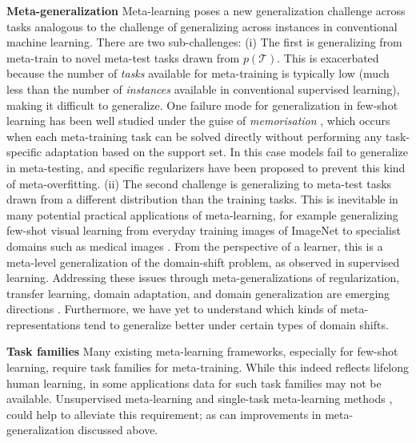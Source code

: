 \documentclass[10pt,journal,compsoc]{IEEEtran}
\newcommand{\cut}[1]{}
\newcommand{\keypoint}[1]{\vspace{0.1cm}\noindent\textbf{#1}\quad}
\begin{document}
\keypoint{Meta-generalization} {Meta-learning poses a new generalization challenge across tasks analogous to the challenge of generalizing across instances in conventional machine learning. There are two sub-challenges: (i) The first is generalizing from meta-train to novel meta-test tasks drawn from $p(\mathcal{T})$. This is exacerbated because the number of \emph{tasks} available for meta-training is typically low (much less than the number of \emph{instances} available in conventional supervised learning), making it difficult to generalize. One failure mode for generalization in few-shot learning has been well studied under the guise of \emph{memorisation} \cite{yin2019meta}, which occurs when each meta-training task can be solved directly without performing any task-specific adaptation based on the support set. In this case models fail to generalize in meta-testing, and specific regularizers \cite{yin2019meta} have been proposed to prevent this kind of meta-overfitting. 
(ii) The second challenge is generalizing to meta-test tasks drawn from a different distribution than the training tasks. This is inevitable in many potential practical applications of meta-learning, for example generalizing few-shot visual learning from everyday training images of ImageNet to specialist domains such as medical images \cite{guo2019new}. From the perspective of a learner, this is a meta-level generalization of the domain-shift problem, as observed in supervised learning. Addressing these issues through meta-generalizations of regularization, transfer learning, domain adaptation, and domain generalization are emerging directions \cite{tseng2020crossdomain}. Furthermore, we have yet to understand which kinds of meta-representations tend to generalize better under certain types of domain shifts. }


\cut{Another interesting direction could be investigating how introducing yet another level of learning abstractions could affect generalization performance, that is, \emph{meta-meta-learning}. By learning how to do meta-learning, perhaps we can find meta-optimizers that can generalize very strongly across a large variety of types and intensities of domain and even modality shifts. Of course computational costs would grow accordingly}


\keypoint{Task families} Many existing meta-learning frameworks, especially for few-shot learning, require task families for meta-training. While this indeed reflects lifelong human learning, in some applications data for such task families may not be available. Unsupervised meta-learning \cite{hsu2018unsupervised,unsupervised2019khoda,antoniou2019assume} and single-task meta-learning methods \cite{meier2018onlinelearningrate,xu2018metagradient,li2019featurecritic,zheng2018intrinsicrewardpg,veeriah2019discovery}, could help to alleviate this requirement; as can improvements in meta-generalization discussed above.
\end{document}
